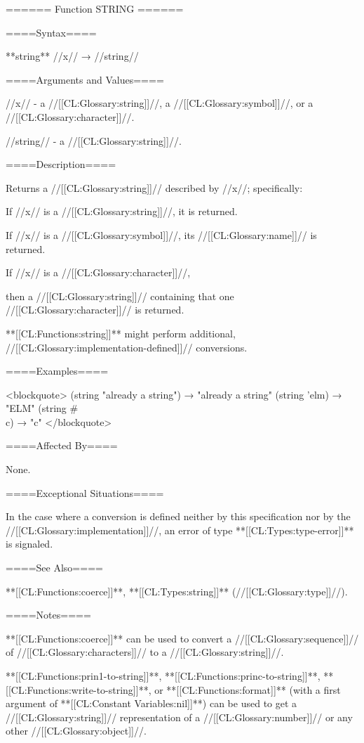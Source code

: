 ====== Function STRING ======

====Syntax====

**string** //x// → //string//

====Arguments and Values====

//x// - a //[[CL:Glossary:string]]//, a //[[CL:Glossary:symbol]]//, or a //[[CL:Glossary:character]]//.

//string// - a //[[CL:Glossary:string]]//.

====Description====

Returns a //[[CL:Glossary:string]]// described by //x//; specifically:

\beginlist \item{\bull} If //x// is a //[[CL:Glossary:string]]//, it is returned. \item{\bull} If //x// is a //[[CL:Glossary:symbol]]//, its //[[CL:Glossary:name]]// is returned. \item{\bull}

If //x// is a //[[CL:Glossary:character]]//,

then a //[[CL:Glossary:string]]// containing that one //[[CL:Glossary:character]]// is returned. \item{\bull}

**[[CL:Functions:string]]** might perform additional, //[[CL:Glossary:implementation-defined]]// conversions.

\endlist

====Examples====

<blockquote> (string "already a string") → "already a string" (string 'elm) → "ELM" (string #\\c) → "c" </blockquote>

====Affected By====

None.

====Exceptional Situations====

In the case where a conversion is defined neither by this specification nor by the //[[CL:Glossary:implementation]]//, an error of type **[[CL:Types:type-error]]** is signaled.

====See Also====

**[[CL:Functions:coerce]]**, **[[CL:Types:string]]** (//[[CL:Glossary:type]]//).

====Notes====

**[[CL:Functions:coerce]]** can be used to convert a //[[CL:Glossary:sequence]]// of //[[CL:Glossary:characters]]// to a //[[CL:Glossary:string]]//.

**[[CL:Functions:prin1-to-string]]**, **[[CL:Functions:princ-to-string]]**, **[[CL:Functions:write-to-string]]**, or **[[CL:Functions:format]]** (with a first argument of **[[CL:Constant Variables:nil]]**) can be used to get a //[[CL:Glossary:string]]// representation of a //[[CL:Glossary:number]]// or any other //[[CL:Glossary:object]]//.

   
